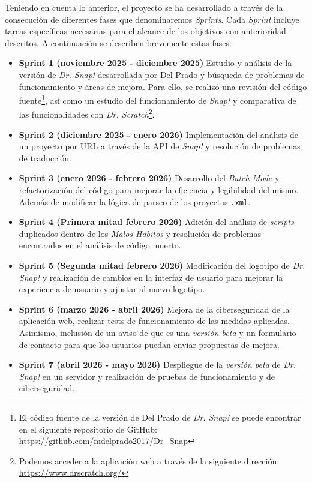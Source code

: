 Teniendo en cuenta lo anterior, el proyecto se ha desarrollado a través de la consecución de diferentes fases que denominaremos \textit{Sprints}. Cada \textit{Sprint} incluye tareas específicas necesarias para el alcance de los objetivos con anterioridad descritos. A continuación se describen brevemente estas fases:
\begin{itemize}
    \item \textbf{Sprint 1 (noviembre 2025 - diciembre 2025)} Estudio y análisis de la versión de \textit{Dr. Snap!} desarrollada por Del Prado y búsqueda de problemas de funcionamiento y áreas de mejora. Para ello, se realizó una revisión del código fuente\footnote{El código fuente de la versión de Del Prado de \textit{Dr. Snap!} se puede encontrar en el siguiente repositorio de GitHub: \url{https://github.com/mdelprado2017/Dr_Snap}}, así como un estudio del funcionamiento de \textit{Snap!} y comparativa de las funcionalidades con \textit{Dr. Scratch}\footnote{Podemos acceder a la aplicación web a través de la siguiente dirección: \url{https://www.drscratch.org/}}. 
    \item \textbf{Sprint 2 (diciembre 2025 - enero 2026)} Implementación del análisis de un proyecto por URL a través de la API de \textit{Snap!} y resolución de problemas de traducción.
    \item \textbf{Sprint 3 (enero 2026 - febrero 2026)} Desarrollo del \textit{Batch Mode} y refactorización del código para mejorar la eficiencia y legibilidad del mismo. Además de modificar la lógica de parseo de los proyectos \texttt{.xml}.
    \item \textbf{Sprint 4 (Primera mitad febrero 2026)} Adición del análisis de \textit{scripts} duplicados dentro de los \textit{Malos Hábitos} y resolución de problemas encontrados en el análisis de código muerto.
    \item \textbf{Sprint 5 (Segunda mitad febrero 2026)} Modificación del logotipo de \textit{Dr. Snap!} y realización de cambios en la interfaz de usuario para mejorar la experiencia de usuario y ajustar al nuevo logotipo.
    \item \textbf{Sprint 6 (marzo 2026 - abril 2026)} Mejora de la ciberseguridad de la aplicación web, realizar tests de funcionamiento de las medidas aplicadas. Asimismo, inclusión de un aviso de que es una \textit{versión beta} y un formulario de contacto para que los usuarios puedan enviar propuestas de mejora.
    \item \textbf{Sprint 7 (abril 2026 - mayo 2026)} Despliegue de la \textit{versión beta} de \textit{Dr. Snap!} en un servidor y realización de pruebas de funcionamiento y de ciberseguridad.

\end{itemize}
